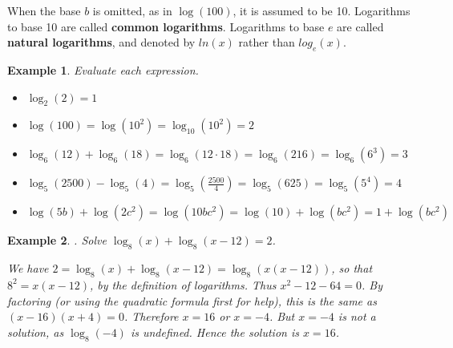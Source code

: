 \documentclass[11pt]{book}               %
\newtheorem{example}{Example}
\begin{document}
When the base $b$ is omitted, as in $\log(100)$, it is assumed to be 10.
Logarithms to base 10 are called \textbf{common logarithms}.
Logarithms to base $e$ are called \textbf{natural logarithms}, and denoted by $ln(x)$ rather than $log_e(x)$.




\begin{example}
Evaluate each expression.

\normalfont
\begin{itemize}
\item $ \log_2{(2)} = 1$
\item $ \log{(100)} = \log{(10^2)} = \log_{10}{(10^2)} = 2 $
\item $ \log_{6}{(12)} + \log_{6}{(18)} = \log_{6}{(12 \cdot 18)} = \log_{6}{(216)} = \log_{6}{(6^3)} = 3$
\item $ \log_{5}{(2500)} - \log_{5}{(4)} = \log_{5}{(\frac{2500}{4})} = \log_{5}{(625)} = \log_{5}{(5^4)} = 4$
\item $  \log(5b) + \log(2c^2) = \log(10bc^2) = \log(10) + \log(bc^2) = 1 + \log(bc^2)$
\end{itemize}
\end{example}

\begin{example}. Solve $  \log_8(x) + \log_8(x - 12) = 2 $.

\normalfont
We have 
$2 = \log_8(x) + \log_8(x - 12) = \log_8(x(x - 12))$, so that
$8^2 = x(x - 12)$, by the definition of logarithms.
Thus $x^2 - 12 - 64 = 0$.  By factoring (or using the quadratic formula first for help), 
this is the same as $ (x-16)(x+4) = 0$.
Therefore  $ x = 16 $ or $ x = -4$.  
But $x = -4$ is not a solution, as $\log_8(-4)$ is undefined.
Hence the solution is $x = 16$.

\end{example}
\end{document}

